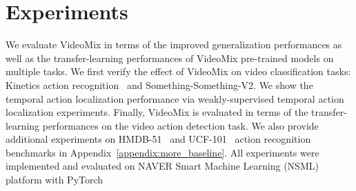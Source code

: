 \section{Experiments}
\label{section:experiments}

We evaluate VideoMix in terms of the improved generalization performances as well as the transfer-learning performances of VideoMix pre-trained models on multiple tasks.
We first verify the effect of VideoMix on video classification tasks: Kinetics action recognition~\cite{kinetics} and Something-Something-V2. 
We show the temporal action localization performance via weakly-supervised temporal action localization experiments.
Finally, VideoMix is evaluated in terms of the transfer-learning performances on the video action detection task.
We also provide additional experiments on HMDB-51~\cite{kuehne2011hmdb} and UCF-101~\cite{soomro2012ucf101} action recognition benchmarks in Appendix~\ref{appendix:more_baseline}.  
All experiments were implemented and evaluated on NAVER Smart Machine Learning (NSML)~\cite{nsml} platform
with PyTorch~\cite{paszke2017automatic} 









